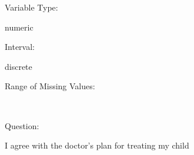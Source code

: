 \documentclass[
]{article}
\begin{document}
\begin{minipage}[t]{0.3\linewidth}

Variable Type:

\end{minipage}%
\begin{minipage}[t]{0.7\linewidth}

numeric

\end{minipage}

\begin{minipage}[t]{0.3\linewidth}

Interval:

\end{minipage}%
\begin{minipage}[t]{0.7\linewidth}

discrete

\end{minipage}

\begin{minipage}[t]{0.3\linewidth}

Range of Missing Values:

\end{minipage}%
\begin{minipage}[t]{0.7\linewidth}

~

\end{minipage}

\begin{minipage}[t]{0.3\linewidth}

Question:

\end{minipage}%
\begin{minipage}[t]{0.7\linewidth}

I agree with the doctor's plan for treating my child

\end{minipage}
\end{document}
